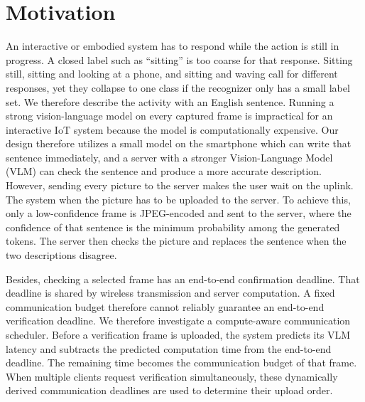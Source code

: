 \section{Motivation}


An interactive or embodied system has to respond while the action is still
in progress. A closed label such as ``sitting'' is too coarse for that
response. Sitting still, sitting and looking at a phone, and sitting and
waving call for different responses, yet they collapse to one class if the
recognizer only has a small label set. We therefore describe the activity
with an English sentence. Running a strong vision-language model on every captured frame is impractical
for an interactive IoT system because the model is computationally expensive.
Our design therefore utilizes a small model on the smartphone which can write that sentence immediately, and a server with a stronger Vision-Language Model (VLM) can check the sentence and produce a more accurate description. However, sending every picture to the server makes the user wait on the uplink. The system when the picture has to be uploaded to the server. To achieve this, only a
low-confidence frame is JPEG-encoded and sent to the server, where the confidence of
that sentence is the minimum probability among the generated tokens. The server then
checks the picture and replaces the sentence when the two descriptions disagree.

Besides, checking a selected frame has an end-to-end confirmation deadline. That
deadline is shared by wireless transmission and server computation. A fixed
communication budget therefore cannot reliably guarantee an end-to-end
verification deadline. We therefore investigate a compute-aware communication scheduler. Before a
verification frame is uploaded, the system predicts its VLM latency
and subtracts the predicted computation time from the end-to-end deadline.
The remaining time becomes the communication budget of that frame. When
multiple clients request verification simultaneously, these dynamically
derived communication deadlines are used to determine their upload order.